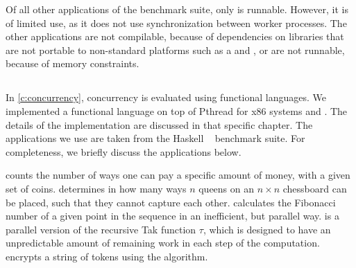 Of all other applications of the benchmark suite, only  is runnable.
However, it is of limited use, as it does not use synchronization between worker processes.
The other applications are not compilable, because of dependencies on libraries that are not portable to non-standard platforms such as a \MicroBlaze and \Starburst, or are not runnable, because of memory constraints.

\subsection{\NoFib}
\label{s:nofib}

In \cref{c:concurrency}, concurrency is evaluated using functional languages.
We implemented a functional language on top of Pthread for x86 systems and \Helix.
The details of the implementation are discussed in that specific chapter.
The applications we use are taken from the Haskell \NoFib*~\cite{nofib} benchmark suite.
For completeness, we briefly discuss the applications below.

 counts the number of ways one can pay a specific amount of money, with a given set of coins.
 determines in how many ways $n$ queens on an $n\times n$ chessboard can be placed, such that they cannot capture each other.
 calculates the Fibonacci number of a given point in the sequence in an inefficient, but parallel way.
 is a parallel version of the recursive Tak function $\tau$, which is designed to have an unpredictable amount of remaining work in each step of the computation.
 encrypts a string of tokens using the  algorithm.


